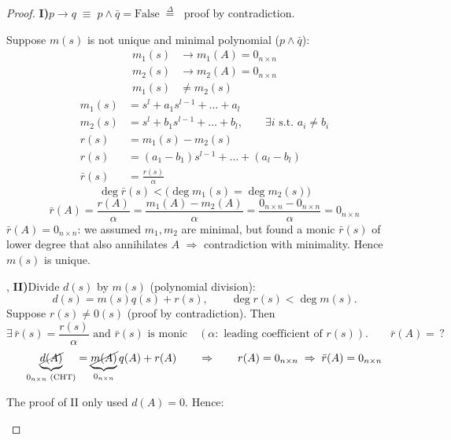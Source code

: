 \begin{proof}
\leavevmode{}%
\textbf{I)}\quad $p\to q \;\equiv\; p\wedge\bar q=\text{False} \;\stackrel{\Delta}{=}\;$ proof by contradiction.

Suppose $m(s)$ is not unique and minimal polynomial ($p\wedge\bar q$):
\begin{align*}
m_1(s) &\longrightarrow m_1(A)=0_{n\times n}\\
m_2(s) &\longrightarrow m_2(A)=0_{n\times n}\\
m_1(s)&\neq m_2(s)
\end{align*}
\begin{align*}
m_1(s)&=s^l+a_1s^{l-1}+\dots+a_l\\
m_2(s)&=s^l+b_1s^{l-1}+\dots+b_l, \qquad \exists i \text{ s.t. } a_i\neq b_i\\
r(s)&=m_1(s)-m_2(s)\\
r(s)&=(a_1-b_1)s^{l-1}+\dots+(a_l-b_l)\\
\bar r(s)&=\frac{r(s)}{\alpha}
\end{align*}
\[ \deg\bar r(s) < \big(\deg m_1(s)=\deg m_2(s)\big) \]
\[
\bar r(A)=\frac{r(A)}{\alpha}=\frac{m_1(A)-m_2(A)}{\alpha}=\frac{0_{n\times n}-0_{n\times n}}{\alpha}=0_{n\times n}
\]
$\bar r(A)=0_{n\times n}$: we assumed $m_1,m_2$ are minimal, but found a monic $\bar r(s)$ of lower degree that also annihilates $A$ $\Rightarrow$ contradiction with minimality. Hence $m(s)$ is unique.

\sep
\textbf{II)}\quad Divide $d(s)$ by $m(s)$ (polynomial division):
\[ d(s)=m(s)q(s)+r(s), \qquad \deg r(s)<\deg m(s). \]
Suppose $r(s)\neq 0(s)$ (proof by contradiction). Then
\[ \exists\,\bar r(s)=\frac{r(s)}{\alpha}\text{ and }\bar r(s)\text{ is monic}\quad(\alpha:\text{ leading coefficient of } r(s)).\qquad \bar r(A)=\,? \]
\[
\underbrace{\cancel{d(A)}}_{0_{n\times n}\text{ (CHT)}}=\underbrace{\cancel{m(A)}}_{0_{n\times n}}q(A)+r(A)\qquad\Rightarrow\qquad r(A)=0_{n\times n}\;\Rightarrow\;\bar r(A)=0_{n\times n}
\]
\begin{insight}
The proof of II only used $d(A)=0$. Hence: 
\end{insight}


\end{proof}

